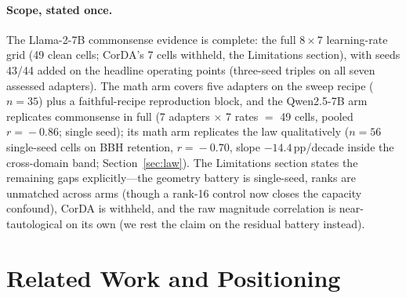 \documentclass[11pt]{article}
\begin{document}
\paragraph{Scope, stated once.} The Llama-2-7B commonsense evidence is complete:
the full $8\times 7$ learning-rate grid (49 clean cells; CorDA's 7 cells withheld,
the Limitations section), with seeds 43/44 added on the headline operating
points (three-seed triples on all seven assessed adapters). The math arm
covers five adapters on the sweep recipe ($n\!=\!35$) plus a faithful-recipe
reproduction block, and the Qwen2.5-7B arm replicates commonsense in full
(7 adapters $\times$ 7 rates $=$ 49 cells, pooled $r\!=\!-0.86$; single seed);
its math arm replicates the law qualitatively ($n\!=\!56$ single-seed cells on
BBH retention, $r\!=\!-0.70$, slope $-14.4$\,pp/decade inside the cross-domain
band; Section~\ref{sec:law}).
The Limitations section states the remaining gaps explicitly---the geometry
battery is single-seed, ranks are unmatched across arms (though a rank-16
control now closes the capacity confound), CorDA is withheld, and the raw
magnitude correlation is near-tautological on its own (we rest the claim on the
residual battery instead).

\section{Related Work and Positioning}\label{sec:related}
\end{document}
